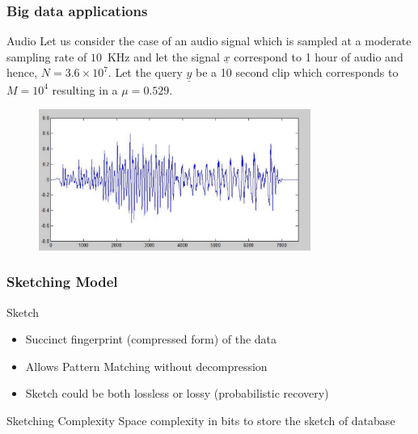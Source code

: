 \documentclass[10pt,xcolor=table]{beamer}
\newcommand{\xv}{\underline{x}}
\newcommand{\yv}{\underline{y}}
\begin{document}
\begin{frame}\frametitle{Big data applications}
\begin{block}{Audio}
Let us consider the case of an audio signal which is sampled at a moderate sampling rate of $10$~KHz and let the signal $\xv$ correspond to 1 hour of audio and hence, $N = 3.6 \times 10^7$. Let the query $\yv$ be a 10 second clip which corresponds to $M = 10^4$ resulting in a $\mu = 0.529$.
\end{block}
\begin{block}{}
\begin{figure}
\includegraphics[width=3.5in]{ScaledVoice}
\end{figure}
\end{block}
\end{frame}

\begin{frame} \frametitle{Sketching Model}
	\begin{block}{Sketch}
		\begin{itemize}
			\item Succinct fingerprint (compressed form) of the data
			\item Allows Pattern Matching without decompression
			\item Sketch could be both lossless or lossy (probabilistic recovery)
		\end{itemize}
	\end{block}
	\begin{block}{Sketching Complexity}
		Space complexity in bits to store the sketch of database
	\end{block}
\end{frame}
\end{document}
